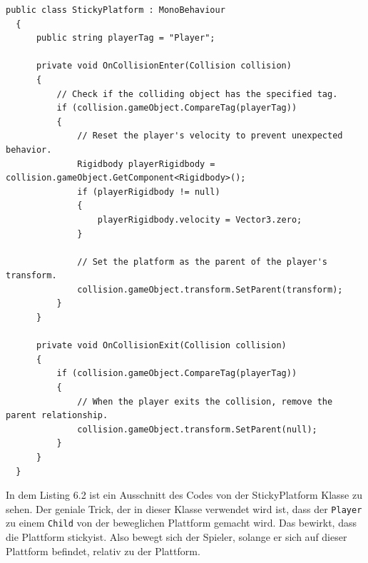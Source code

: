 \begin{lstlisting}[language=CSharp,caption={StickyPlatform Klasse.},label=code:mainmenu]
  public class StickyPlatform : MonoBehaviour
  {
      public string playerTag = "Player";
  
      private void OnCollisionEnter(Collision collision)
      {
          // Check if the colliding object has the specified tag.
          if (collision.gameObject.CompareTag(playerTag))
          {
              // Reset the player's velocity to prevent unexpected behavior.
              Rigidbody playerRigidbody = collision.gameObject.GetComponent<Rigidbody>();
              if (playerRigidbody != null)
              {
                  playerRigidbody.velocity = Vector3.zero;
              }
  
              // Set the platform as the parent of the player's transform.
              collision.gameObject.transform.SetParent(transform);
          }
      }
  
      private void OnCollisionExit(Collision collision)
      {
          if (collision.gameObject.CompareTag(playerTag))
          {
              // When the player exits the collision, remove the parent relationship.
              collision.gameObject.transform.SetParent(null);
          }
      }
  }
\end{lstlisting}

In dem Listing 6.2 ist ein Ausschnitt des Codes von der StickyPlatform Klasse zu sehen. Der geniale Trick, der in dieser Klasse verwendet wird ist, dass der \verb+Player+ zu einem \verb+Child+ von der beweglichen Plattform gemacht wird. Das bewirkt, dass die Plattform \glqq sticky\grqq \space ist. Also bewegt sich der Spieler, solange er sich auf dieser Plattform befindet, relativ zu der Plattform.

\pagebreak
